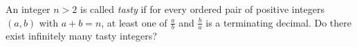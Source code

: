 An integer $n>2$ is called \emph{tasty} if for every ordered pair of positive integers $\left(a,b\right)$ with $a+b=n$, at least one of $\frac{a}{b}$ and $\frac{b}{a}$ is a terminating decimal. Do there exist infinitely many tasty integers?